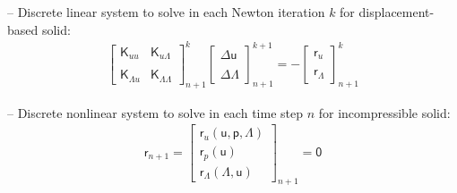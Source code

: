 \documentclass[a4paper,12pt]{report}
\newcommand{\bs}[1]{\boldsymbol{#1}}
\newcommand{\ROP}{\bs{\mathsf{r}}}
\newcommand{\LMZ}{\bs{\mathsf{\Lambda}}}
\newcommand{\lmzi}{\mathit{\Lambda}} %
\begin{document}
-- Discrete linear system to solve in each Newton iteration $k$ for displacement-based solid:
\begin{equation}
\label{equation-lin-sys-solid-0d}
\begin{aligned}
\begin{bmatrix} \bs{\mathsf{K}}_{uu} & \bs{\mathsf{K}}_{u\lmzi} \\ \\ \bs{\mathsf{K}}_{\lmzi u} & \bs{\mathsf{K}}_{\lmzi\lmzi}\end{bmatrix}_{n+1}^{k}\begin{bmatrix} \Delta\bs{\mathsf{u}} \\ \\ \Delta\LMZ \end{bmatrix}_{n+1}^{k+1}=-\begin{bmatrix} \ROP_{u} \\ \\ \ROP_{\lmzi}\end{bmatrix}_{n+1}^{k}
\end{aligned}
\end{equation}

-- Discrete nonlinear system to solve in each time step $n$ for incompressible solid:
\begin{equation}
\label{equation-nonlin-sys-solid-inc-0d}
\begin{aligned}
\ROP_{n+1} = \begin{bmatrix} \ROP_{u}(\bs{\mathsf{u}},\bs{\mathsf{p}},\LMZ) \\ \ROP_{p}(\bs{\mathsf{u}}) \\ \ROP_{\mathit{\Lambda}}(\LMZ,\bs{\mathsf{u}}) \end{bmatrix}_{n+1} = \bs{\mathsf{0}}
\end{aligned}
\end{equation}
\end{document}
